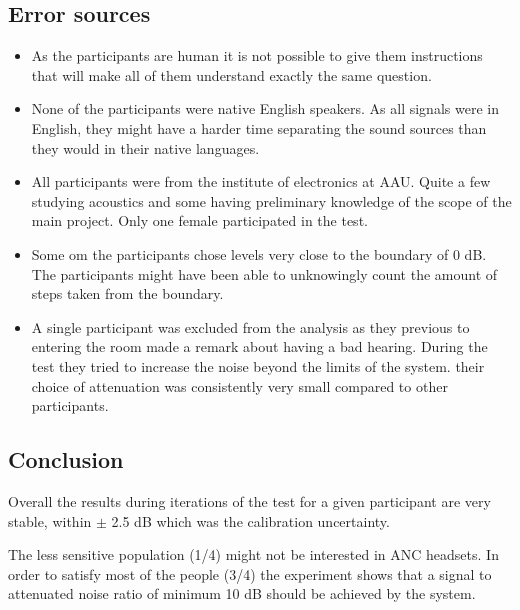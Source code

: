 \subsection{Error sources} \label{SubSec:ErrSouNoiAtt}
\begin{itemize}
\item As the participants are human it is not possible to give them instructions that will make all of them understand exactly the same question. 
\item None of the participants were native English speakers. As all signals were in English, they might have a harder time separating the sound sources than they would in their native languages. 
\item All participants were from the institute of electronics at AAU. Quite a few studying acoustics and some having preliminary knowledge of the scope of the main project. Only one female participated in the test.
\item Some om the participants chose levels very close to the boundary of 0 dB. The participants might have been able to unknowingly count the amount of steps taken from the boundary.  
\item A single participant was excluded from the analysis as they previous to entering the room made a remark about having a bad hearing. During the test they tried to increase the noise beyond the limits of the system. their choice of attenuation was consistently very small compared to other participants.
\end{itemize}

\subsection{Conclusion}
Overall the results during iterations of the test for a given participant are very stable, within $\pm$ 2.5 dB which was the calibration uncertainty. 

The less sensitive population (1/4) might not be interested in ANC headsets. In order to satisfy most of the people (3/4) the experiment shows that a signal to attenuated noise ratio of minimum 10 dB should be achieved by the system.  





